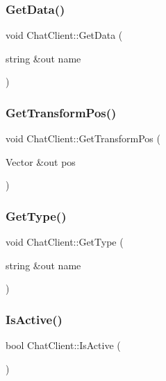 \subsubsection{\texorpdfstring{Get\+Data()}{GetData()}}
{\footnotesize\ttfamily void Chat\+Client\+::\+Get\+Data (\begin{DoxyParamCaption}\item[{string \&out}]{name }\end{DoxyParamCaption})}

\hypertarget{class_chat_client_a5021d6a5e0916e82bfa79a3a15df72dd}{}\label{class_chat_client_a5021d6a5e0916e82bfa79a3a15df72dd} 
\subsubsection{\texorpdfstring{Get\+Transform\+Pos()}{GetTransformPos()}}
{\footnotesize\ttfamily void Chat\+Client\+::\+Get\+Transform\+Pos (\begin{DoxyParamCaption}\item[{Vector \&out}]{pos }\end{DoxyParamCaption})}

\hypertarget{class_chat_client_a190e2eb69502d589245d71edb4e74742}{}\label{class_chat_client_a190e2eb69502d589245d71edb4e74742} 
\subsubsection{\texorpdfstring{Get\+Type()}{GetType()}}
{\footnotesize\ttfamily void Chat\+Client\+::\+Get\+Type (\begin{DoxyParamCaption}\item[{string \&out}]{name }\end{DoxyParamCaption})}

\hypertarget{class_chat_client_acbf1b2170af3d95ea82e23c4b3a41be4}{}\label{class_chat_client_acbf1b2170af3d95ea82e23c4b3a41be4} 
\subsubsection{\texorpdfstring{Is\+Active()}{IsActive()}}
{\footnotesize\ttfamily bool Chat\+Client\+::\+Is\+Active (\begin{DoxyParamCaption}{ }\end{DoxyParamCaption})}

